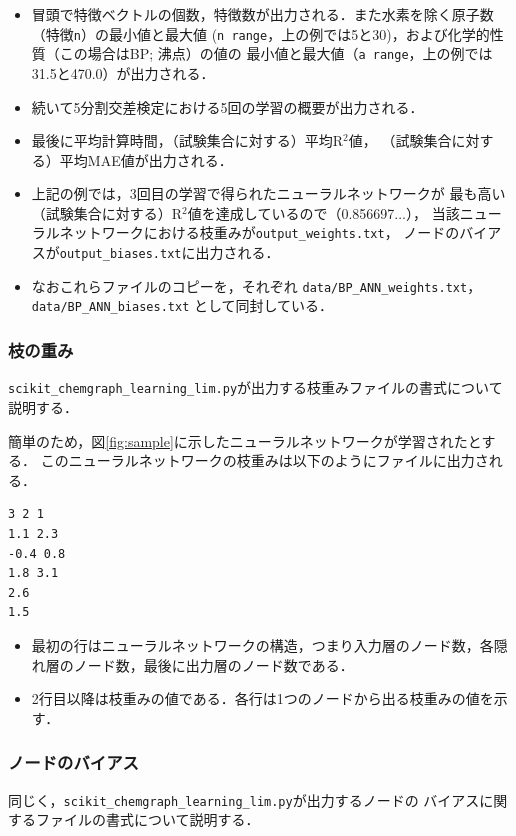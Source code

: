 \documentclass[11pt,titlepage,dvipdfmx,twoside]{jsbook}
\newcommand{\figref}[1]{図\ref{fig:#1}}
\begin{document}
{\begin{itemize}
\item  冒頭で特徴ベクトルの個数，特徴数が出力される．また水素を除く原子数（特徴\verb|n|）の最小値と最大値 (\verb|n range|，上の例では5と30)，および化学的性質（この場合はBP; 沸点）の値の
最小値と最大値（\verb|a range|，上の例では31.5と470.0）が出力される．
\item 続いて5分割交差検定における5回の学習の概要が出力される．
\item 最後に平均計算時間，（試験集合に対する）平均R$^2$値，
（試験集合に対する）平均MAE値が出力される．
\item 上記の例では，3回目の学習で得られたニューラルネットワークが
最も高い（試験集合に対する）R$^2$値を達成しているので（0.856697$\dots$），
当該ニューラルネットワークにおける枝重みが\verb|output_weights.txt|，
ノードのバイアスが\verb|output_biases.txt|に出力される．
\item なおこれらファイルのコピーを，それぞれ
\verb|data/BP_ANN_weights.txt|，\verb|data/BP_ANN_biases.txt|
として同封している．
\end{itemize}
}

\subsubsection{枝の重み}
\verb|scikit_chemgraph_learning_lim.py|が出力する枝重みファイルの書式について説明する．

簡単のため，\figref{sample}に示したニューラルネットワークが学習されたとする．
このニューラルネットワークの枝重みは以下のようにファイルに出力される．

\begin{oframed}
{\small
\begin{verbatim}
3 2 1
1.1 2.3
-0.4 0.8
1.8 3.1
2.6
1.5
\end{verbatim}
}
\end{oframed}
\begin{itemize}
\item 最初の行はニューラルネットワークの構造，つまり入力層のノード数，各隠れ層のノード数，最後に出力層のノード数である．
\item 2行目以降は枝重みの値である．各行は1つのノードから出る枝重みの値を示す．
\end{itemize}


\subsubsection{ノードのバイアス}
同じく，\verb|scikit_chemgraph_learning_lim.py|が出力するノードの
バイアスに関するファイルの書式について説明する．
\end{document}
